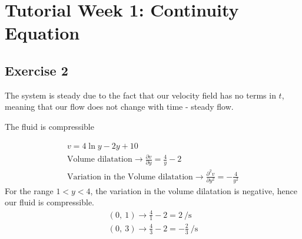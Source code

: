 \documentclass[class=report, crop=false, 12pt,a4paper]{standalone}
\begin{document}
\section{Tutorial Week 1: Continuity Equation}
\subsection{Exercise 2}
The system is steady due to the fact that our velocity field has no terms in $t$, meaning that our flow does not change with time - steady flow.

The fluid is compressible

\begin{gather}
  v = 4\ln{y} - 2y + 10\\
  \textrm{Volume dilatation} \rightarrow \frac{\partial v}{\partial y} = \frac{4}{y} - 2\\
  \textrm{Variation in the Volume dilatation} \rightarrow \frac{\partial ^2 v}{\partial y^2} = -\frac{4}{y^2}
\end{gather}
For the range $1 < y < 4$, the variation in the volume dilatation is negative, hence our fluid is compressible. 
\begin{gather}
  (0, \ 1) \rightarrow \frac{4}{1} - 2 = 2 \ \si{\per\second}\\
  (0, \ 3) \rightarrow \frac{4}{3} - 2 = -\frac{2}{3} \ \si{\per\second}
\end{gather}
\end{document}
